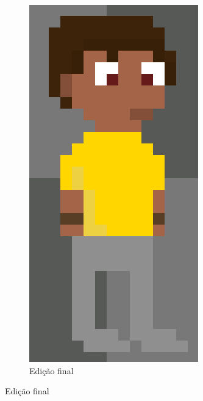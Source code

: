 \begin{figure}[htbp]
\begin{subfigure}{0.23\linewidth}
        \includegraphics[width=0.83\linewidth]{figs/pixelLab/dia3/fix1.PNG}
        \caption{\small Edição final}
        \label{fig:pixelLabAjusteFino2d}
    \end{subfigure}
\end{figure}

